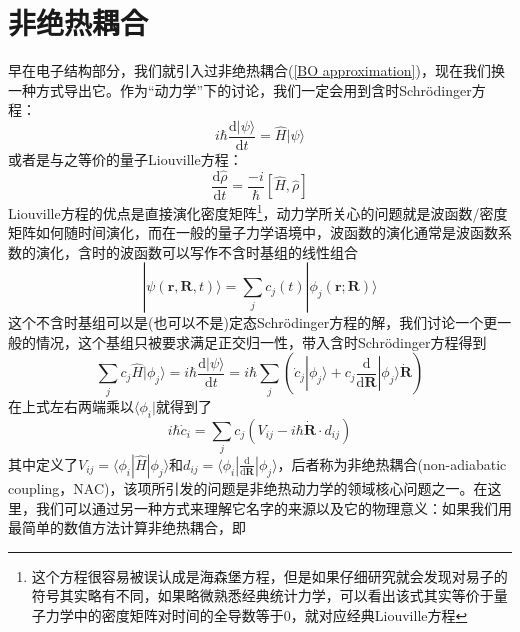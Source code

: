 \documentclass[12pt,a4paper,openany,twoside]{book}
\numberwithin{equation}{section}
\begin{document}
      \section{非绝热耦合}
        早在电子结构部分，我们就引入过非绝热耦合(\ref{BO approximation})，现在我们换一种方式导出它。作为“动力学”下的讨论，我们一定会用到含时Schr\"odinger方程：
        \begin{equation}
          i \hbar \frac{\mathrm{d} | \psi \rangle}{\mathrm{d} t}=\hat{H} | \psi \rangle
        \end{equation}
        或者是与之等价的量子Liouville方程：
        \begin{equation}
          \frac{\mathrm{d} \hat{\rho}}{\mathrm{d} t}=\frac{-i}{\hbar}[\hat{H}, \hat{\rho}]
        \end{equation}
        Liouville方程的优点是直接演化密度矩阵\footnote{这个方程很容易被误认成是海森堡方程，但是如果仔细研究就会发现对易子的符号其实略有不同，如果略微熟悉经典统计力学，可以看出该式其实等价于量子力学中的密度矩阵对时间的全导数等于0，就对应经典Liouville方程}，动力学所关心的问题就是波函数/密度矩阵如何随时间演化，而在一般的量子力学语境中，波函数的演化通常是波函数系数的演化，含时的波函数可以写作不含时基组的线性组合
        \begin{equation}
          |\psi(\mathbf{r}, \mathbf{R}, t)\rangle=\sum_{j} c_{j}(t) |\phi_{j}(\mathbf{r} ; \mathbf{R})\rangle
          \label{linear combination}
        \end{equation}
        这个不含时基组可以是(也可以不是)定态Schr\"odinger方程的解，我们讨论一个更一般的情况，这个基组只被要求满足正交归一性，带入含时Schr\"odinger方程得到
        \begin{equation}
          \sum_j c_j \hat{H}|\phi_j\rangle=i \hbar \frac{\mathrm{d} | \psi \rangle}{\mathrm{d} t}=i \hbar\sum_j\left(\dot{c}_j|\phi_j\rangle+c_j\frac{\mathrm{d}}{\mathrm{d}\mathbf{R}}|\phi_j\rangle\dot{\mathbf{R}}\right)
        \end{equation}
        在上式左右两端乘以$\langle\phi_i|$就得到了
        \begin{equation}
          i \hbar \dot{c}_{i}=\sum_{j} c_{j}\left(V_{i j}-i \hbar \dot{\mathbf{R}} \cdot d_{i j}\right)
          \label{time-depend-coeff}
        \end{equation}
        其中定义了$V_{ij}=\langle\phi_i|\hat{H}|\phi_j\rangle$和$d_{ij}=\langle\phi_i|\frac{\mathrm{d}}{\mathrm{d}\mathbf{R}}|\phi_j\rangle$，后者称为非绝热耦合(non-adiabatic coupling，NAC)，该项所引发的问题是非绝热动力学的领域核心问题之一。在这里，我们可以通过另一种方式来理解它名字的来源以及它的物理意义：如果我们用最简单的数值方法计算非绝热耦合，即
\end{document}
